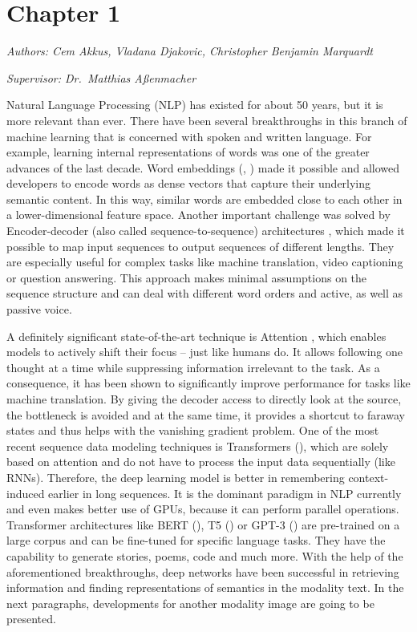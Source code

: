 \documentclass[
]{krantz}
\begin{document}
\hypertarget{chapter-1}{%
\chapter{Chapter 1}\label{chapter-1}}

\emph{Authors: Cem Akkus, Vladana Djakovic, Christopher Benjamin Marquardt}

\emph{Supervisor: Dr.~Matthias Aßenmacher}

Natural Language Processing (NLP) has existed for about 50 years, but it is more relevant than ever. There have been several breakthroughs in this branch of machine learning that is concerned with spoken and written language. For example, learning internal representations of words was one of the greater advances of the last decade. Word embeddings (\citet{Mikolov2013}, \citet{Bojanowski2016}) made it possible and allowed developers to encode words as dense vectors that capture their underlying semantic content. In this way, similar words are embedded close to each other in a lower-dimensional feature space. Another important challenge was solved by Encoder-decoder (also called sequence-to-sequence) architectures \citet{Sutskever2014}, which made it possible to map input sequences to output sequences of different lengths. They are especially useful for complex tasks like machine translation, video captioning or question answering. This approach makes minimal assumptions on the sequence structure and can deal with different word orders and active, as well as passive voice.

A definitely significant state-of-the-art technique is Attention \citet{Bahdanau2014}, which enables models to actively shift their focus -- just like humans do. It allows following one thought at a time while suppressing information irrelevant to the task. As a consequence, it has been shown to significantly improve performance for tasks like machine translation. By giving the decoder access to directly look at the source, the bottleneck is avoided and at the same time, it provides a shortcut to faraway states and thus helps with the vanishing gradient problem. One of the most recent sequence data modeling techniques is Transformers (\citet{vaswani2017attention}), which are solely based on attention and do not have to process the input data sequentially (like RNNs). Therefore, the deep learning model is better in remembering context-induced earlier in long sequences. It is the dominant paradigm in NLP currently and even makes better use of GPUs, because it can perform parallel operations. Transformer architectures like BERT (\citet{Devlin2018}), T5 (\citet{Raffel2019}) or GPT-3 (\citet{brown2020language}) are pre-trained on a large corpus and can be fine-tuned for specific language tasks. They have the capability to generate stories, poems, code and much more. With the help of the aforementioned breakthroughs, deep networks have been successful in retrieving information and finding representations of semantics in the modality text. In the next paragraphs, developments for another modality image are going to be presented.
\end{document}

